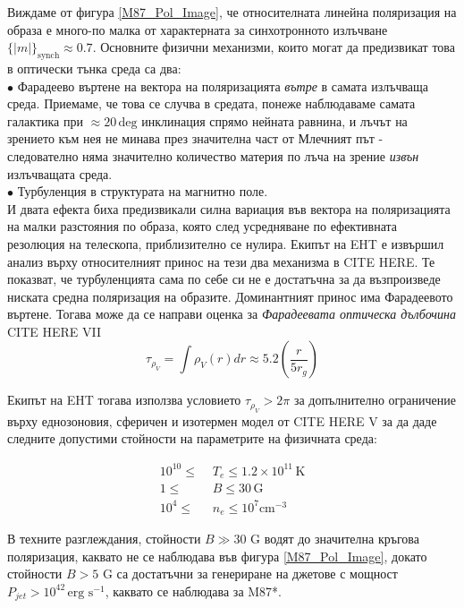  Виждаме от фигура \ref{M87_Pol_Image}, че относителната линейна поляризация на образа е много-по малка от характерната за синхотронното излъчване $\lbrace |m| \rbrace_\text{synch}\approx 0.7$. Основните физични механизми, които могат да предизвикат това в оптически тънка среда са два:\\\newline
 $\bullet$ Фарадеево въртене на вектора на поляризацията \emph{вътре} в самата излъчваща среда. Приемаме, че това се случва в средата, понеже наблюдаваме самата галактика при $\approx 20\,\text{deg}$ инклинация спрямо нейната равнина, и лъчът на зрението към нея не минава през значителна част от Млечният път - следователно няма значително количество материя по лъча на зрение \emph{извън} излъчващата среда.\\
 $\bullet$ Турбуленция в структурата на магнитно поле.\\\newline
И двата ефекта биха предизвикали силна вариация във вектора на поляризацията на малки разстояния по образа, която след усредняване по ефективната резолюция на телескопа, приблизително се нулира. Екипът на EHT е извършил анализ върху относителният принос на тези два механизма в CITE HERE. Те показват, че турбуленцията сама по себе си не е достатъчна за да възпроизведе ниската средна поляризация на образите. Доминантният принос има Фарадеевото въртене. Тогава може да се направи оценка за \emph{Фарадеевата оптическа дълбочина} CITE HERE VII
\begin{equation}
	\tau_{\rho_V} = \int \rho_{V}(r)dr\approx 5.2\left(\frac{r}{5r_g}\right)
\end{equation}
\lfoot{}

Екипът на EHT тогава използва условието $\tau_{\rho_V}>2\pi$ за допълнително ограничение върху еднозоновия, сферичен и изотермен модел от CITE HERE V за да даде следните допустими стойности на параметрите на физичната среда:

\begin{equation}
	\begin{split}
		10^{10} \le\,\, &T_e \le 1.2 \times 10^{11}\,\text{K}\\
		1 \le\,\, &B \le 30\, \text{G}\\
		10^4 \le\,\, &n_e \le 10^7 \text{cm}^{-3}
	\end{split}
\end{equation}

В техните разглеждания, стойности $B \gg 30$ G водят до значителна кръгова поляризация, каквато не се наблюдава във фигура \ref{M87_Pol_Image}, докато стойности $B > 5$ G са достатъчни за генериране на джетове с мощност $P_{jet} > 10^{42}\,\text{erg s}^{-1}$, каквато се наблюдава за M87*.\\

